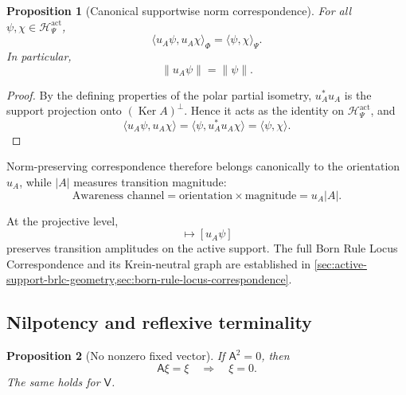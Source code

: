 \documentclass[11pt,reqno]{scrartcl}
\newcommand{\scrHP}{\mathscr H_{\Psi}}
\newcommand{\Aodd}{\mathsf A}
\newcommand{\Vodd}{\mathsf V}
\newcommand{\inner}[2]{\langle #1,#2\rangle}
\DeclareMathOperator{\Ker}{Ker}
\theoremstyle{plain}
\newtheorem{proposition}[proposition]{Proposition}
\theoremstyle{definition}
\theoremstyle{remark}
\begin{document}
\begin{proposition}[Canonical supportwise norm correspondence]
\label{prop:polar-survival}
For all \(\psi,\chi\in\scrHP^{\mathrm{act}}\),
\begin{equation}
  \inner{u_A\psi}{u_A\chi}_{\Phi}
  =\inner{\psi}{\chi}_{\Psi}.
  \label{eq:polar-inner-product}
\end{equation}
In particular,
\begin{equation}
  \|u_A\psi\|=\|\psi\|.
  \label{eq:polar-norm}
\end{equation}
\end{proposition}

\begin{proof}
By the defining properties of the polar partial isometry,
\(u_A^*u_A\) is the support projection onto \((\Ker A)^\perp\).  Hence it acts
as the identity on \(\scrHP^{\mathrm{act}}\), and
\begin{equation}
  \inner{u_A\psi}{u_A\chi}
  =\inner{\psi}{u_A^*u_A\chi}
  =\inner{\psi}{\chi}.
\end{equation}
\end{proof}

Norm-preserving correspondence therefore belongs canonically to the
orientation \(u_A\), while \(|A|\) measures transition magnitude:
\begin{equation}
  \boxed{
  \text{Awareness channel}
  =
  \text{orientation}\times\text{magnitude}
  =u_A|A|.}
  \label{eq:orientation-magnitude}
\end{equation}

At the projective level,
\begin{equation}
  [\psi]\longmapsto[u_A\psi]
  \label{eq:projective-polar}
\end{equation}
preserves transition amplitudes on the active support.  The full Born Rule Locus Correspondence and its Krein-neutral graph are
established in \cref{sec:active-support-brlc-geometry,sec:born-rule-locus-correspondence}.

\subsection{Nilpotency and reflexive terminality}

\begin{proposition}[No nonzero fixed vector]
\label{prop:no-fixed-vector}
If \(\Aodd^2=0\), then
\begin{equation}
  \Aodd\xi=\xi
  \quad\Longrightarrow\quad
  \xi=0.
  \label{eq:no-fixed-vector}
\end{equation}
The same holds for \(\Vodd\).
\end{proposition}
\end{document}
